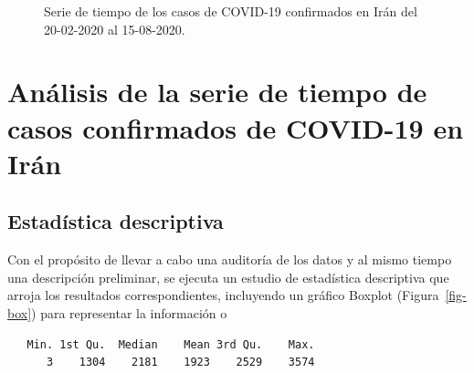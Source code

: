\documentclass[
  us-letterpaper,
]{scrreprt}
\theoremstyle{plain}
\theoremstyle{definition}
\theoremstyle{definition}
\theoremstyle{plain}
\theoremstyle{remark}
\begin{document}
\begin{figure}


\caption{\label{fig-tspdf}Serie de tiempo de los casos de COVID-19
confirmados en Irán del 20-02-2020 al 15-08-2020.}

\end{figure}%

\section{Análisis de la serie de tiempo de casos confirmados de COVID-19
en
Irán}\label{anuxe1lisis-de-la-serie-de-tiempo-de-casos-confirmados-de-covid-19-en-iruxe1n}

\subsection{Estadística descriptiva}\label{estaduxedstica-descriptiva}

Con el propósito de llevar a cabo una auditoría de los datos y al mismo
tiempo una descripción preliminar, se ejecuta un estudio de estadística
descriptiva que arroja los resultados correspondientes, incluyendo un
gráfico Boxplot (Figura~\ref{fig-box}) para representar la información o

\begin{verbatim}
   Min. 1st Qu.  Median    Mean 3rd Qu.    Max. 
      3    1304    2181    1923    2529    3574 
\end{verbatim}
\end{document}
